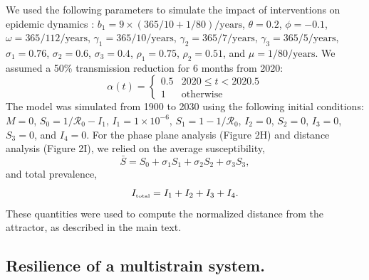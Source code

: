 \documentclass[12pt]{article}
\newcommand{\tsub}[2]{#1_{{\textrm{\tiny #2}}}}
\begin{document}
We used the following parameters to simulate the impact of interventions on epidemic dynamics \citep{pitzer2015environmental}: $b_1 = 9 \times (365/10+1/80)/\mathrm{years}$, $\theta = 0.2$, $\phi = -0.1$, $\omega=365/112/\mathrm{years}$, $\gamma_1=365/10/\mathrm{years}$, $\gamma_2=365/7/\mathrm{years}$, $\gamma_3=365/5/\mathrm{years}$, $\sigma_1 = 0.76$, $\sigma_2 = 0.6$, $\sigma_3 = 0.4$, $\rho_1 = 0.75$, $\rho_2 = 0.51$, and $\mu = 1/80/\mathrm{years}$.
We assumed a 50\% transmission reduction for 6 months from 2020:
\begin{equation}
\alpha(t) = \begin{cases}
0.5 & 2020 \leq t< 2020.5\\
1 & \textrm{otherwise}
\end{cases}
\end{equation}
The model was simulated from 1900 to 2030 using the following initial conditions: $M=0$, $S_0=1/\mathcal R_0-I_1$, $I_1=1\times 10^{-6}$, $S_1=1-1/\mathcal R_0$, $I_2=0$, $S_2=0$, $I_3=0$, $S_3=0$, and $I_4=0$.
For the phase plane analysis (Figure 2H) and distance analysis (Figure 2I), we relied on the average susceptibility,
\begin{equation}
\bar{S} = S_0 + \sigma_1 S_1 + \sigma_2 S_2 + \sigma_3 S_3,
\end{equation}
and total prevalence,
\begin{equation}
\tsub{I}{total} = I_1 + I_2 + I_3 + I_4.
\end{equation}
These quantities were used to compute the normalized distance from the attractor, as described in the main text.

\subsection*{Resilience of a multistrain system.}
\end{document}
